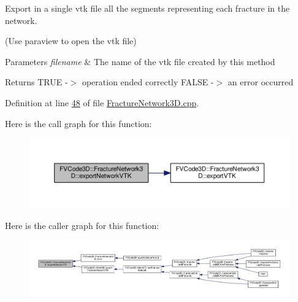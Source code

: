 Export in a single vtk file all the segments representing each fracture in the network. 

(Use paraview to open the vtk file) 
\begin{DoxyParams}{Parameters}
{\em filename} & The name of the vtk file created by this method \\
\hline
\end{DoxyParams}
\begin{DoxyReturn}{Returns}
T\+R\+UE -\/$>$ operation ended correctly F\+A\+L\+SE -\/$>$ an error occurred 
\end{DoxyReturn}


Definition at line \hyperlink{FractureNetwork3D_8cpp_source_l00048}{48} of file \hyperlink{FractureNetwork3D_8cpp_source}{Fracture\+Network3\+D.\+cpp}.



Here is the call graph for this function\+:
\nopagebreak
\begin{figure}[H]
\begin{center}
\leavevmode
\includegraphics[width=350pt]{classFVCode3D_1_1FractureNetwork3D_ab4a7dea9b15402cb2c82cf501c7e2356_cgraph}
\end{center}
\end{figure}




Here is the caller graph for this function\+:
\nopagebreak
\begin{figure}[H]
\begin{center}
\leavevmode
\includegraphics[width=350pt]{classFVCode3D_1_1FractureNetwork3D_ab4a7dea9b15402cb2c82cf501c7e2356_icgraph}
\end{center}
\end{figure}


